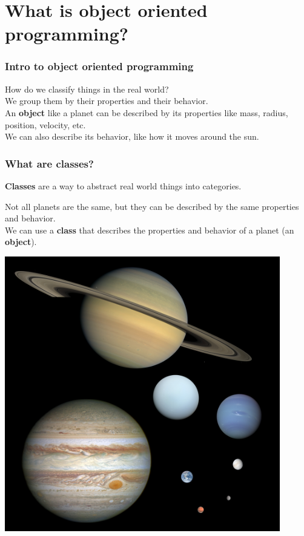 \documentclass{beamer}
\begin{document}
\section{What is object oriented programming?}
\begin{frame}
  \frametitle{Intro to object oriented programming}
  How do we classify things in the real world?\\
  \vspace{5mm}
  We group them by their properties and their behavior.\\
  \vspace{5mm}
  An \textbf{object} like a planet can be described by its properties like mass, radius, position, velocity, etc.\\
  \vspace{5mm}
  We can also describe its behavior, like how it moves around the sun.\\
\end{frame}
\begin{frame}
  \frametitle{What are classes?}
  \textbf{Classes} are a way to abstract real world things into categories.\\
  \begin{minipage}[t]{0.55\textwidth}
    \vspace{-3cm}
    Not all planets are the same, but they can be described by the same properties and behavior.\\
    We can use a \textbf{class} that describes the properties and behavior of a planet (an \textbf{object}).\\
  \end{minipage}%
  \hspace{5mm}
  \begin{minipage}[t]{0.35\textwidth}
    \centering
    \includegraphics[width=0.9\textwidth]{examples/fig/Planet_collage_to_scale.jpg}
\end{minipage}
\end{frame} 
\end{document}
